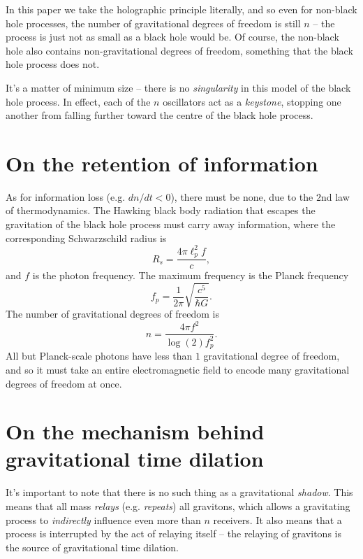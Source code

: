 \documentclass[12pt]{article}
\begin{document}
In this paper we take the holographic principle literally, and so even for non-black hole processes, the number of gravitational degrees of freedom is still $n$ -- the process is just not as small as a black hole would be.
Of course, the non-black hole also contains non-gravitational degrees of freedom, something that the black hole process does not.

It's a matter of minimum size -- there is no {\textit{singularity}} in this model of the black hole process.
In effect, each of the $n$ oscillators act as a {\textit{keystone}}, stopping one another from falling further toward the centre of the black hole process.







\section{On the retention of information}

As for information loss (e.g. $dn / dt < 0$), there must be none, due to the $2$nd law of thermodynamics.
The Hawking black body radiation that escapes the gravitation of the black hole process must carry away information, where the corresponding Schwarzschild radius is
\begin{equation}
R_s = \frac{4 \pi \ell_p^2 f}{c},
\end{equation}
and $f$ is the photon frequency.
The maximum frequency is the Planck frequency
\begin{equation}
f_p = \frac{1}{2 \pi} \sqrt{\frac{c^5}{\hbar G}}.
\end{equation}
The number of gravitational degrees of freedom is
\begin{equation}
n = \frac{4 \pi f^2}{\log(2) f_p^2}.%
\end{equation}
All but Planck-scale photons have less than $1$ gravitational degree of freedom, and so it must take an entire electromagnetic field to encode many gravitational degrees of freedom at once.






\section{On the mechanism behind gravitational time dilation}
It's important to note that there is no such thing as a gravitational {\textit{shadow}}.
This means that all mass {\textit{relays}} (e.g. {\textit{repeats}}) all gravitons, which allows a gravitating process to {\textit{indirectly}} influence even more than $n$ receivers.
It also means that a process is interrupted by the act of relaying itself -- the relaying of gravitons is the source of gravitational time dilation.
\end{document}

